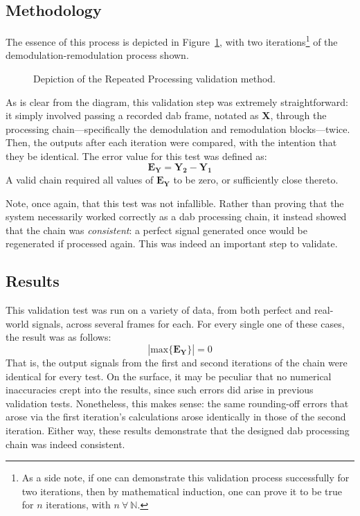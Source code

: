 \documentclass[class=report,11pt,crop=false]{standalone}
\begin{document}
\subsection{Methodology}
The essence of this process is depicted in Figure~\ref{fig:repeated-process-diagram}, with two iterations\footnote{As a side note, if one can demonstrate this validation process successfully for two iterations, then by mathematical induction, one can prove it to be true for \(n\) iterations, with \(n \: \forall \: \mathbb{N}\).} of the demodulation-remodulation process shown.

\begin{figure}[htbp]
  \centering
  \captionsetup{type=figure}
  \def\svgwidth{\linewidth}
  { %
      }
  \caption{Depiction of the Repeated Processing validation method.}
  \label{fig:repeated-process-diagram}
\end{figure}

As is clear from the diagram, this validation step was extremely straightforward: it simply involved passing a recorded \gls{dab} frame, notated as \(\mathbf{X}\), through the processing chain---specifically the demodulation and remodulation blocks---twice. Then, the outputs after each iteration were compared, with the intention that they be identical. The error value for this test was defined as:
\begin{equation}
  \mathbf{E_{Y}} = \mathbf{Y_2} - \mathbf{Y_1}
\end{equation}
A valid chain required all values of \(\mathbf{E_Y}\) to be zero, or sufficiently close thereto.

Note, once again, that this test was not infallible. Rather than proving that the system necessarily worked correctly as a \gls{dab} processing chain, it instead showed that the chain was \emph{consistent}: a perfect signal generated once would be regenerated if processed again. This was indeed an important step to validate.

\subsection{Results}
This validation test was run on a variety of data, from both perfect and real-world signals, across several frames for each. For every single one of these cases, the result was as follows:
\begin{equation}
  \left| \mathrm{max} \{ \mathbf{E_Y} \} \right| = 0
\end{equation}
That is, the output signals from the first and second iterations of the chain were identical for every test. On the surface, it may be peculiar that no numerical inaccuracies crept into the results, since such errors did arise in previous validation tests. Nonetheless, this makes sense: the same rounding-off errors that arose via the first iteration's calculations arose identically in those of the second iteration. Either way, these results demonstrate that the designed \gls{dab} processing chain was indeed consistent.
\end{document}
